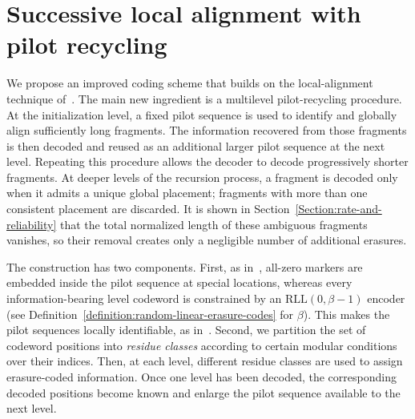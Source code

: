\documentclass[journal,letterpaper,onecolumn,11pt]{IEEEtran}
\begin{document}
\section{Successive local alignment with pilot recycling}\label{section:successive alignment}
We propose an improved coding scheme that builds on the local-alignment technique of~\cite{liu2026improved}. The main new ingredient is a multilevel pilot-recycling procedure. 
At the initialization level, a fixed pilot sequence is used to identify and globally align sufficiently long fragments. 
The information recovered from those fragments is then decoded and reused as an additional larger pilot sequence at the next level. 
Repeating this procedure allows the decoder to decode progressively shorter fragments. 
At deeper levels of the recursion process, a fragment is decoded only when it admits a unique global placement; fragments with more than one consistent placement are discarded. 
It is shown in Section~\ref{Section:rate-and-reliability} that the total normalized length of these ambiguous fragments vanishes, so their removal creates only a negligible number of additional erasures.

The construction has two components. 
First, as in~\cite{liu2026improved}, all-zero markers are embedded inside the pilot sequence at special locations, whereas every information-bearing level codeword is constrained by an $\mathrm{RLL}(0,\beta-1)$ encoder (see Definition~\ref{definition:random-linear-erasure-codes} for $\beta$). 
This makes the pilot sequences locally identifiable, as in~\cite{liu2026improved}.
Second, we partition the set of codeword positions into \textit{residue classes} according to certain modular conditions over their indices. 
Then, at each level, different residue classes are used to assign
erasure-coded information.
Once one level has been decoded, the corresponding decoded positions become known and enlarge the pilot sequence available to the next level.
\end{document}
